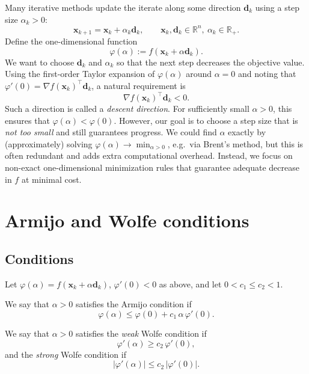 Many iterative methods update the iterate along some direction $\mathbf{d}_k$ using a
step size $\alpha_k>0$:
\[
  \mathbf{x}_{k+1} = \mathbf{x}_k + \alpha_k \mathbf{d}_k,
  \qquad
  \mathbf{x}_k,\mathbf{d}_k\in\mathbb{R}^n,\ \alpha_k\in\mathbb{R}_{+}.
\]
Define the one-dimensional function
\[
  \varphi(\alpha):= f(\mathbf{x}_k+\alpha \mathbf{d}_k).
\]
We want to choose $\mathbf{d}_k$ and $\alpha_k$ so that the next step decreases the objective
value. Using the first-order Taylor expansion of $\varphi(\alpha)$ around $\alpha=0$ and noting that
$\varphi'(0)=\nabla f(\mathbf{x}_k)^\top \mathbf{d}_k$, a natural requirement is
\[
  \nabla f(\mathbf{x}_k)^\top \mathbf{d}_k < 0.
\]
Such a direction is called a \emph{descent direction}. For sufficiently small $\alpha>0$, this ensures that
$\varphi(\alpha)<\varphi(0)$. However, our goal is to choose a step size that is \emph{not too small} and still
guarantees progress.
We could find $\alpha$ exactly by (approximately) solving $\varphi(\alpha)\to \min_{\alpha>0}$, e.g.\ via
Brent's method, but this is often redundant and adds extra computational overhead. Instead, we focus on
non-exact one-dimensional minimization rules that guarantee adequate decrease in $f$ at minimal cost.


\section{Armijo and Wolfe conditions}
\subsection{Conditions}
Let $\varphi(\alpha)=f(\mathbf{x}_k+\alpha \mathbf{d}_k)$, $\varphi'(0)<0$ as above, and let
$0<c_1\le c_2<1$.
\begin{definition}
We say that $\alpha>0$ satisfies the Armijo condition if
\[
  \varphi(\alpha)\le \varphi(0)+c_1\,\alpha\,\varphi'(0).
\]
\end{definition}

\begin{definition}
  We say that $\alpha>0$ satisfies the \emph{weak} Wolfe condition if
\[
  \varphi'(\alpha)\ge c_2\,\varphi'(0),
\]
and the \emph{strong} Wolfe condition if
\[
  |\varphi'(\alpha)|\le c_2\,|\varphi'(0)|.
\]
\end{definition}

